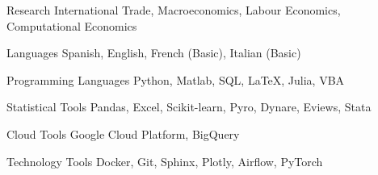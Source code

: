 

\begin{cvskills}

\cvskill
    {Research} %
    {International Trade, Macroeconomics, Labour Economics, Computational Economics} %

\cvskill
    {Languages} %
    {Spanish, English, French (Basic), Italian (Basic)} %

\cvskill
    {Programming Languages} %
    {Python, Matlab, SQL, LaTeX, Julia, VBA} %

\cvskill
    {Statistical Tools} %
    {Pandas, Excel, Scikit-learn, Pyro, Dynare, Eviews, Stata} %

\cvskill
    {Cloud Tools} %
    {Google Cloud Platform, BigQuery} %

\cvskill
    {Technology Tools} %
    {Docker, Git, Sphinx, Plotly, Airflow, PyTorch} %

\end{cvskills}

